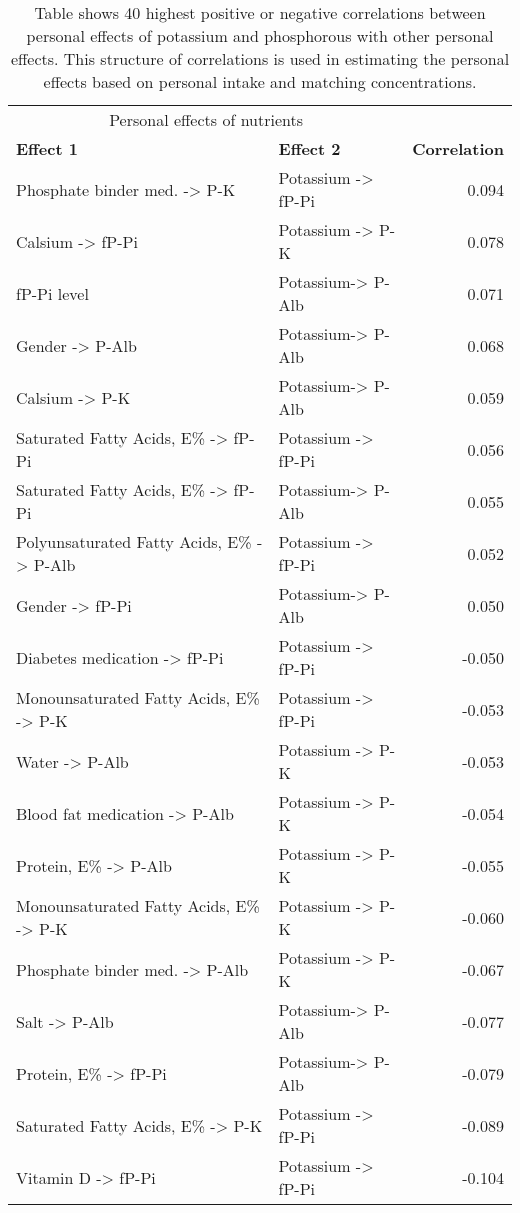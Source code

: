 \documentclass[border=1mm, preview]{standalone}
\begin{document}
\begin{table}[H]

\caption{Table shows 40 highest positive or negative correlations between personal effects of potassium and phosphorous with other personal effects. This structure of correlations is used in estimating the personal effects based on personal intake and matching concentrations.}
\centering
\begin{tabular}[t]{llr}
\toprule
\multicolumn{2}{c}{Personal effects of nutrients} & \multicolumn{1}{c}{ } \\
\cmidrule(l{3pt}r{3pt}){1-2}
\textbf{Effect 1} & \textbf{Effect 2} & \textbf{Correlation}\\
\midrule
Phosphate binder med. -> P-K & Potassium -> fP-Pi & 0.094\\
Calsium -> fP-Pi & Potassium -> P-K & 0.078\\
fP-Pi level & Potassium-> P-Alb & 0.071\\
Gender -> P-Alb & Potassium-> P-Alb & 0.068\\
Calsium -> P-K & Potassium-> P-Alb & 0.059\\
\addlinespace
Saturated Fatty Acids, E\% -> fP-Pi & Potassium -> fP-Pi & 0.056\\
Saturated Fatty Acids, E\% -> fP-Pi & Potassium-> P-Alb & 0.055\\
Polyunsaturated Fatty Acids, E\% -> P-Alb & Potassium -> fP-Pi & 0.052\\
Gender -> fP-Pi & Potassium-> P-Alb & 0.050\\
Diabetes medication -> fP-Pi & Potassium -> fP-Pi & -0.050\\
\addlinespace
Monounsaturated Fatty Acids, E\% -> P-K & Potassium -> fP-Pi & -0.053\\
Water -> P-Alb & Potassium -> P-K & -0.053\\
Blood fat medication -> P-Alb & Potassium -> P-K & -0.054\\
Protein, E\% -> P-Alb & Potassium -> P-K & -0.055\\
Monounsaturated Fatty Acids, E\% -> P-K & Potassium -> P-K & -0.060\\
\addlinespace
Phosphate binder med. -> P-Alb & Potassium -> P-K & -0.067\\
Salt -> P-Alb & Potassium-> P-Alb & -0.077\\
Protein, E\% -> fP-Pi & Potassium-> P-Alb & -0.079\\
Saturated Fatty Acids, E\% -> P-K & Potassium -> fP-Pi & -0.089\\
Vitamin D -> fP-Pi & Potassium -> fP-Pi & -0.104\\

\end{tabular}
\end{table}
\end{document}
